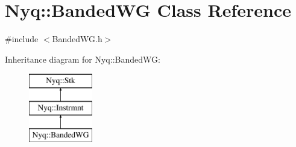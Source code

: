 \hypertarget{class_nyq_1_1_banded_w_g}{}\section{Nyq\+:\+:Banded\+WG Class Reference}
\label{class_nyq_1_1_banded_w_g}


{\ttfamily \#include $<$Banded\+W\+G.\+h$>$}

Inheritance diagram for Nyq\+:\+:Banded\+WG\+:\begin{figure}[H]
\begin{center}
\leavevmode
\includegraphics[height=3.000000cm]{class_nyq_1_1_banded_w_g}
\end{center}
\end{figure}
